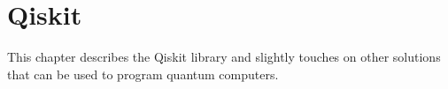 \chapter{Qiskit}\label{ch:qiskit}
This chapter describes the Qiskit library and slightly touches on other solutions that can be used to program quantum computers.